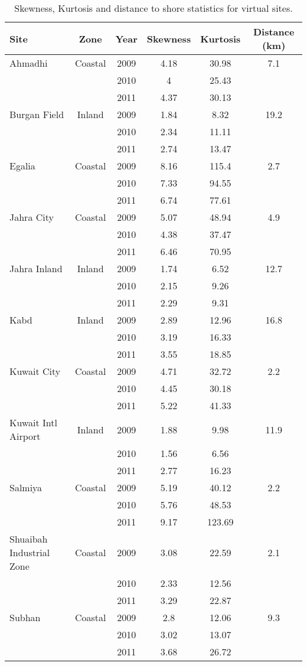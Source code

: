 \begin{table}[!htb]
\centering
\caption{Skewness, Kurtosis and distance to shore statistics for virtual sites.}
\label{tb:skewdist}
\begin{tabular}{@{}lccccc@{}}
\toprule
\textbf{Site} & \textbf{Zone} & \textbf{Year} & \textbf{Skewness} & \textbf{Kurtosis} & \textbf{Distance (km)} \\ \midrule
Ahmadhi & Coastal & 2009 & 4.18 & 30.98 & 7.1 \\
 &  & 2010 & 4 & 25.43 &  \\
 &  & 2011 & 4.37 & 30.13 &  \\
Burgan Field & Inland & 2009 & 1.84 & 8.32 & 19.2 \\
 &  & 2010 & 2.34 & 11.11 &  \\
 &  & 2011 & 2.74 & 13.47 &  \\
Egalia & Coastal & 2009 & 8.16 & 115.4 & 2.7 \\
 &  & 2010 & 7.33 & 94.55 &  \\
 &  & 2011 & 6.74 & 77.61 &  \\
Jahra City & Coastal & 2009 & 5.07 & 48.94 & 4.9 \\
 &  & 2010 & 4.38 & 37.47 &  \\
 &  & 2011 & 6.46 & 70.95 &  \\
Jahra Inland & Inland & 2009 & 1.74 & 6.52 & 12.7 \\
 &  & 2010 & 2.15 & 9.26 &  \\
 &  & 2011 & 2.29 & 9.31 &  \\
Kabd & Inland & 2009 & 2.89 & 12.96 & 16.8 \\
 &  & 2010 & 3.19 & 16.33 &  \\
 &  & 2011 & 3.55 & 18.85 &  \\
Kuwait City & Coastal & 2009 & 4.71 & 32.72 & 2.2 \\
 &  & 2010 & 4.45 & 30.18 &  \\
 &  & 2011 & 5.22 & 41.33 &  \\
Kuwait Intl Airport & Inland & 2009 & 1.88 & 9.98 & 11.9 \\
 &  & 2010 & 1.56 & 6.56 &  \\
 &  & 2011 & 2.77 & 16.23 &  \\
Salmiya & Coastal & 2009 & 5.19 & 40.12 & 2.2 \\
 &  & 2010 & 5.76 & 48.53 &  \\
 &  & 2011 & 9.17 & 123.69 &  \\
Shuaibah Industrial Zone & Coastal & 2009 & 3.08 & 22.59 & 2.1 \\
 &  & 2010 & 2.33 & 12.56 &  \\
 &  & 2011 & 3.29 & 22.87 &  \\
Subhan & Coastal & 2009 & 2.8 & 12.06 & 9.3 \\
 &  & 2010 & 3.02 & 13.07 &  \\
 &  & 2011 & 3.68 & 26.72 &  \\ \bottomrule
\end{tabular}
\end{table}
